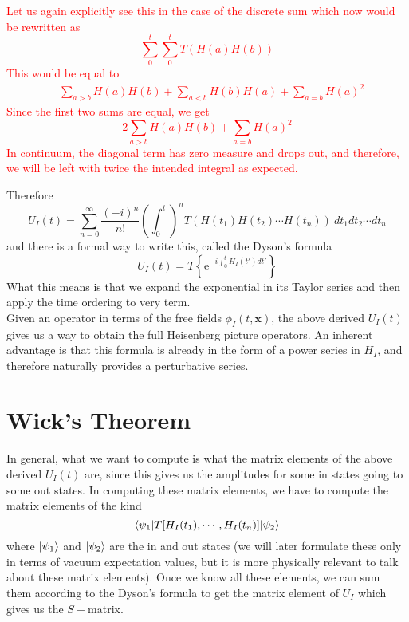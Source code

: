 \documentclass[11pt, notitlepage]{report}
\newcommand{\e}{\mathrm{e}}
\numberwithin{equation}{section}
\begin{document}
    \textcolor{red}{
        Let us again explicitly see this in the case of the discrete sum 
        which now would be rewritten as 
        \begin{equation*}
            \sum_0^t \sum_0^t T(H(a) H(b))
        \end{equation*}
        This would be equal to 
        \begin{align*}
            &\sum_{a>b} H(a)H(b) + \sum_{a<b}H(b)H(a) + \sum_{a=b}H(a)^2
        \end{align*}
        Since the first two sums are equal, we get 
        \begin{equation*}
            2\sum_{a>b} H(a)H(b) + \sum_{a=b}H(a)^2
        \end{equation*}
        In continuum, the diagonal term has zero measure and drops out, and therefore, we will be left with twice the intended integral as expected.\\
    }

    Therefore 
    \begin{equation*}
        U_I(t) = \sum_{n=0}^\infty \frac{(-i)^n}{n!} \left(\int_0^t\right)^n T(H(t_1) H(t_2) \cdots H(t_n)) ~dt_1 dt_2 \cdots dt_n 
    \end{equation*}
    and there is a formal way to write this, called the Dyson's formula
    \begin{equation*}
        U_I(t) = T\left\{ \e^{-i\int_0^t H_I(t')dt'}  \right\}
    \end{equation*}
    What this means is that we expand the exponential in its Taylor series and then apply the time ordering to very term.\\

    Given an operator in terms of the free fields \(\phi_I(t,\textbf{x})\), the above derived \(U_I(t)\) gives us a way to obtain the full Heisenberg picture operators. An inherent advantage is that this formula is already in the form of a power series in \(H_I\), and therefore naturally provides a perturbative series.

    \newpage
    \section{Wick's Theorem}
    In general, what we want to compute is what the matrix elements of the above derived \(U_I(t)\) are, since this gives us the amplitudes for some in states going to some out states. In computing these matrix elements, we have to compute the matrix elements of the kind 
    \begin{equation*}
        \braket{\psi_1 | T[H_I(t_1),\cdots,H_I(t_n)]|\psi_2}
    \end{equation*}
    where \(\ket{\psi_1}\) and \(\ket{\psi_2}\) are the in and out states (we will later formulate these only in terms of vacuum expectation values, but it is more physically relevant to talk about these matrix elements). Once we know all these elements, we can sum them according to the Dyson's formula to get the matrix element of \(U_I\) which gives us the \(S-\)matrix. \\
\end{document}
